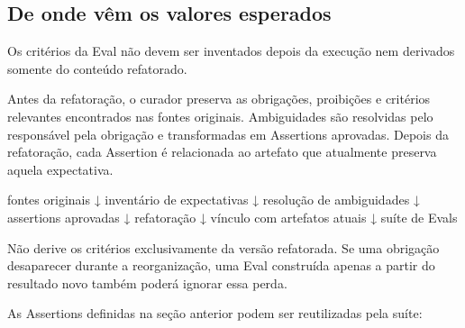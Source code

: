 \documentclass[
  10pt,
  a4paper,
  oneside]{book}
\newenvironment{Shaded}{}{}
\newcommand{\NormalTok}[1]{#1}
\renewenvironment{Shaded}{\begin{snugshade}}{\end{snugshade}}%
\begin{document}
\hypertarget{de-onde-vuxeam-os-valores-esperados}{%
\subsection{De onde vêm os valores
esperados}\label{de-onde-vuxeam-os-valores-esperados}}

Os critérios da Eval não devem ser inventados depois da execução nem
derivados somente do conteúdo refatorado.

Antes da refatoração, o curador preserva as obrigações, proibições e
critérios relevantes encontrados nas fontes originais. Ambiguidades são
resolvidas pelo responsável pela obrigação e transformadas em Assertions
aprovadas. Depois da refatoração, cada Assertion é relacionada ao
artefato que atualmente preserva aquela expectativa.

\begin{Shaded}
\begin{Highlighting}[]
\NormalTok{fontes originais}
\NormalTok{        ↓}
\NormalTok{inventário de expectativas}
\NormalTok{        ↓}
\NormalTok{resolução de ambiguidades}
\NormalTok{        ↓}
\NormalTok{assertions aprovadas}
\NormalTok{        ↓}
\NormalTok{refatoração}
\NormalTok{        ↓}
\NormalTok{vínculo com artefatos atuais}
\NormalTok{        ↓}
\NormalTok{suíte de Evals}
\end{Highlighting}
\end{Shaded}

Não derive os critérios exclusivamente da versão refatorada. Se uma
obrigação desaparecer durante a reorganização, uma Eval construída
apenas a partir do resultado novo também poderá ignorar essa perda.

As Assertions definidas na seção anterior podem ser reutilizadas pela
suíte:
\end{document}
